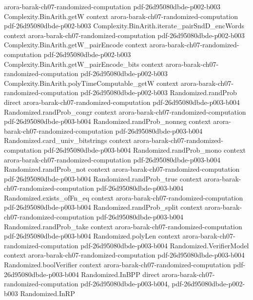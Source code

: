 \begin{theorem}
  {arora-barak-ch07-randomized-computation}
  {pdf-26d95080dbde-p002-b003}
\proofstep
  {Complexity.BinArith.getW}
  {context}
  {arora-barak-ch07-randomized-computation}
  {pdf-26d95080dbde-p002-b003}
\proofstep
  {Complexity.BinArith.iterate_pairSndD_encWords}
  {context}
  {arora-barak-ch07-randomized-computation}
  {pdf-26d95080dbde-p002-b003}
\proofstep
  {Complexity.BinArith.getW_pairEncode}
  {context}
  {arora-barak-ch07-randomized-computation}
  {pdf-26d95080dbde-p002-b003}
\proofstep
  {Complexity.BinArith.getW_pairEncode_bits}
  {context}
  {arora-barak-ch07-randomized-computation}
  {pdf-26d95080dbde-p002-b003}
\proofstep
  {Complexity.BinArith.polyTimeComputable_getW}
  {context}
  {arora-barak-ch07-randomized-computation}
  {pdf-26d95080dbde-p002-b003}
\proofstep
  {Randomized.randProb}
  {direct}
  {arora-barak-ch07-randomized-computation}
  {pdf-26d95080dbde-p003-b004}
\proofstep
  {Randomized.randProb_congr}
  {context}
  {arora-barak-ch07-randomized-computation}
  {pdf-26d95080dbde-p003-b004}
\proofstep
  {Randomized.randProb_nonneg}
  {context}
  {arora-barak-ch07-randomized-computation}
  {pdf-26d95080dbde-p003-b004}
\proofstep
  {Randomized.card_univ_bitstrings}
  {context}
  {arora-barak-ch07-randomized-computation}
  {pdf-26d95080dbde-p003-b004}
\proofstep
  {Randomized.randProb_mono}
  {context}
  {arora-barak-ch07-randomized-computation}
  {pdf-26d95080dbde-p003-b004}
\proofstep
  {Randomized.randProb_not}
  {context}
  {arora-barak-ch07-randomized-computation}
  {pdf-26d95080dbde-p003-b004}
\proofstep
  {Randomized.randProb_true}
  {context}
  {arora-barak-ch07-randomized-computation}
  {pdf-26d95080dbde-p003-b004}
\proofstep
  {Randomized.exists_ofFn_eq}
  {context}
  {arora-barak-ch07-randomized-computation}
  {pdf-26d95080dbde-p003-b004}
\proofstep
  {Randomized.randProb_split}
  {context}
  {arora-barak-ch07-randomized-computation}
  {pdf-26d95080dbde-p003-b004}
\proofstep
  {Randomized.randProb_take}
  {context}
  {arora-barak-ch07-randomized-computation}
  {pdf-26d95080dbde-p003-b004}
\proofstep
  {Randomized.polyLen}
  {context}
  {arora-barak-ch07-randomized-computation}
  {pdf-26d95080dbde-p003-b004}
\proofstep
  {Randomized.VerifierModel}
  {context}
  {arora-barak-ch07-randomized-computation}
  {pdf-26d95080dbde-p003-b004}
\proofstep
  {Randomized.boolVerifier}
  {context}
  {arora-barak-ch07-randomized-computation}
  {pdf-26d95080dbde-p003-b004}
\proofstep
  {Randomized.InBPP}
  {direct}
  {arora-barak-ch07-randomized-computation}
  {pdf-26d95080dbde-p003-b004,
    pdf-26d95080dbde-p002-b003}
\proofstep
  {Randomized.InRP}

\end{theorem}
